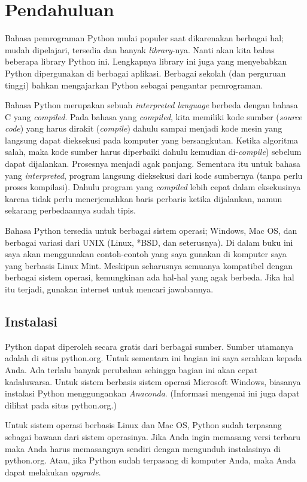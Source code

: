 \chapter{Pendahuluan}
Bahasa pemrograman Python mulai populer saat dikarenakan berbagai hal; mudah
dipelajari, tersedia dan banyak {\em library}-nya. Nanti akan kita bahas beberapa
library Python ini. Lengkapnya library ini juga yang menyebabkan
Python dipergunakan di berbagai aplikasi. Berbagai sekolah (dan
perguruan tinggi) bahkan mengajarkan Python sebagai pengantar pemrograman.

Bahasa Python merupakan sebuah {\em interpreted language} berbeda dengan
bahasa C yang {\em compiled}. Pada bahasa yang {\em compiled}, kita memiliki
kode sumber ({\em source code}) yang harus dirakit ({\em compile}) dahulu
sampai menjadi kode mesin yang langsung dapat dieksekusi pada komputer
yang bersangkutan. Ketika algoritma salah, maka kode sumber harus diperbaiki
dahulu kemudian di-{\em compile}) sebelum dapat dijalankan. Prosesnya
menjadi agak panjang. Sementara itu untuk bahasa yang {\em interpreted},
program langsung dieksekusi dari kode sumbernya (tanpa perlu proses kompilasi).
Dahulu program yang {\em compiled} lebih cepat dalam eksekusinya karena
tidak perlu menerjemahkan baris perbaris ketika dijalankan, namun sekarang
perbedaannya sudah tipis.

Bahasa Python tersedia untuk berbagai sistem operasi; Windows, Mac OS, dan
berbagai variasi dari UNIX (Linux, *BSD, dan seterusnya). Di dalam buku ini
saya akan menggunakan contoh-contoh yang saya gunakan di komputer saya yang
berbasis Linux Mint. Meskipun seharusnya semuanya kompatibel dengan berbagai
sistem operasi, kemungkinan ada hal-hal yang agak berbeda. Jika hal itu
terjadi, gunakan internet untuk mencari jawabannya.

\section{Instalasi}
Python dapat diperoleh secara gratis dari berbagai sumber. Sumber utamanya
adalah di situs python.org. Untuk sementara ini bagian ini saya serahkan kepada
Anda. Ada terlalu banyak perubahan sehingga bagian ini akan cepat kadaluwarsa.
Untuk sistem berbasis sistem operasi Microsoft Windows, biasanya instalasi 
Python menggungankan {\em Anaconda}. (Informasi mengenai ini juga dapat
dilihat pada situs python.org.)

Untuk sistem operasi berbasis Linux dan Mac OS, Python sudah terpasang sebagai
bawaan dari sistem operasinya. Jika Anda ingin memasang versi terbaru maka
Anda harus memasangnya sendiri dengan mengunduh instalasinya di python.org.
Atau, jika Python sudah terpasang di komputer Anda, maka Anda dapat melakukan
{\em upgrade}.


